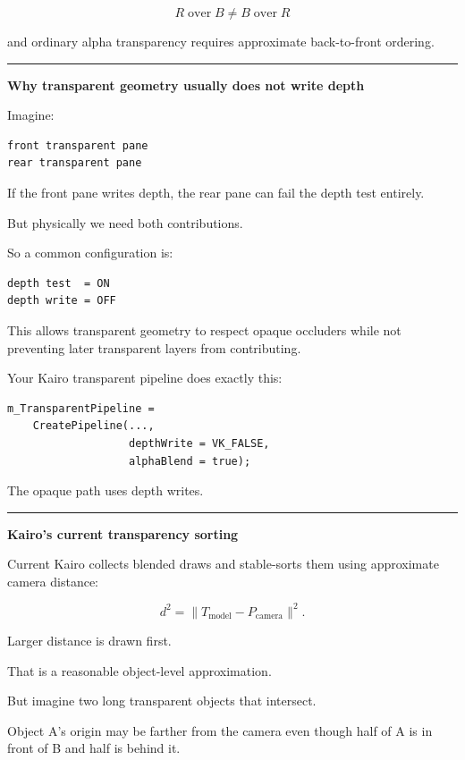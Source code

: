 \[
\boxed{
R\operatorname{over}B
\neq
B\operatorname{over}R
}
\]

and ordinary alpha transparency requires approximate back-to-front ordering.

\begin{center}\rule{0.5\linewidth}{0.5pt}\end{center}

\textbf{Why transparent geometry usually does not write depth}

Imagine:

\begin{verbatim}
front transparent pane
rear transparent pane
\end{verbatim}

If the front pane writes depth, the rear pane can fail the depth test entirely.

But physically we need both contributions.

So a common configuration is:

\begin{verbatim}
depth test  = ON
depth write = OFF
\end{verbatim}

This allows transparent geometry to respect opaque occluders while not preventing later transparent layers from contributing.

Your Kairo transparent pipeline does exactly this:

\begin{verbatim}
m_TransparentPipeline =
    CreatePipeline(...,
                   depthWrite = VK_FALSE,
                   alphaBlend = true);
\end{verbatim}

The opaque path uses depth writes.

\begin{center}\rule{0.5\linewidth}{0.5pt}\end{center}

\textbf{Kairo's current transparency sorting}

Current Kairo collects blended draws and stable-sorts them using approximate camera distance:

\[
d^2=\|T_{\text{model}}-P_{\text{camera}}\|^2.
\]

Larger distance is drawn first.

That is a reasonable object-level approximation.

But imagine two long transparent objects that intersect.

Object A's origin may be farther from the camera even though half of A is in front of B and half is behind it.

